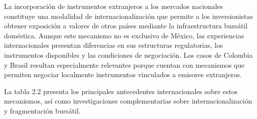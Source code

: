 
La incorporación de instrumentos extranjeros a los mercados nacionales constituye una modalidad de internacionalización que permite a los inversionistas obtener exposición a valores de otros países mediante la infraestructura bursátil doméstica. Aunque este mecanismo no es exclusivo de México, las experiencias internacionales presentan diferencias en sus estructuras regulatorias, los instrumentos disponibles y las condiciones de negociación. Los casos de Colombia y Brasil resultan especialmente relevantes porque cuentan con mecanismos que permiten negociar localmente instrumentos vinculados a emisores extranjeros.

La tabla 2.2 presenta los principales antecedentes internacionales sobre estos mecanismos, así como investigaciones complementarias sobre internacionalización y fragmentación bursátil.


